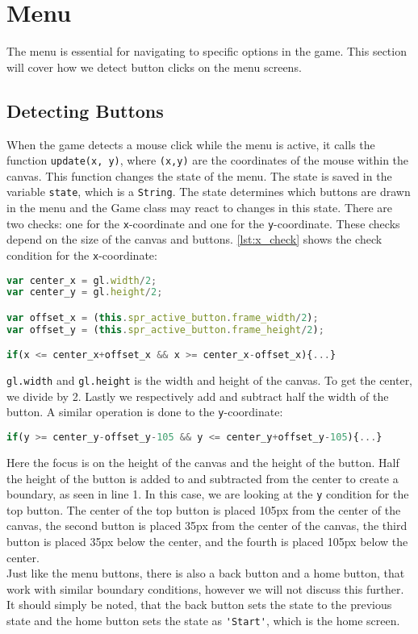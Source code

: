 \section{Menu}
\label{sec:imp_menu}

The menu is essential for navigating to specific options in the game. This section will cover how we detect button clicks on the menu screens.

\subsection{Detecting Buttons}

When the game detects a mouse click while the menu is active, it calls the function \texttt{update(x, y)}, where \texttt{(x,y)} are the coordinates of the mouse within the canvas. This function changes the state of the menu. The state is saved in the variable \verb|state|, which is a \verb|String|. The state determines which buttons are drawn in the menu and the Game class may react to changes in this state. There are two checks: one for the \texttt{x}-coordinate and one for the \texttt{y}-coordinate. These checks depend on the size of the canvas and buttons. \autoref{lst:x_check} shows the check condition for the \texttt{x}-coordinate:

\begin{lstlisting}[language=JavaScript, caption=x condition check for menu buttons, label=lst:x_check]
var center_x = gl.width/2;
var center_y = gl.height/2;

var offset_x = (this.spr_active_button.frame_width/2);
var offset_y = (this.spr_active_button.frame_height/2);

if(x <= center_x+offset_x && x >= center_x-offset_x){...}
\end{lstlisting}

\verb|gl.width| and \verb|gl.height| is the width and height of the canvas. To get the center, we divide by 2. Lastly we respectively add and subtract half the width of the button. A similar operation is done to the \texttt{y}-coordinate:

\begin{lstlisting}[language=JavaScript, caption=y condition check for menu buttons]
if(y >= center_y-offset_y-105 && y <= center_y+offset_y-105){...}
\end{lstlisting}

Here the focus is on the height of the canvas and the height of the button. Half the height of the button is added to and subtracted from the center to create a boundary, as seen in line 1. In this case, we are looking at the \texttt{y} condition for the top button. The center of the top button is placed 105px from the center of the canvas, the second button is placed 35px from the center of the canvas, the third button is placed 35px below the center, and the fourth is placed 105px below the center.\\

Just like the menu buttons, there is also a back button and a home button, that work with similar boundary conditions, however we will not discuss this further. It should simply be noted, that the back button sets the state to the previous state and the home button sets the state as \verb|'Start'|, which is the home screen.